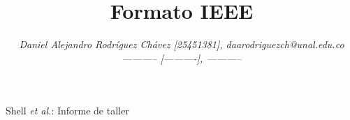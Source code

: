 \title{Formato IEEE}

\author{\emph{\small{Daniel Alejandro Rodríguez Chávez [25451381], daarodriguezch@unal.edu.co}}
\emph{\small{----------- [----------], \textit{-----------}}}}

{Shell \MakeLowercase{\textit{et al.}}: Informe de taller}

                                                        
\maketitle